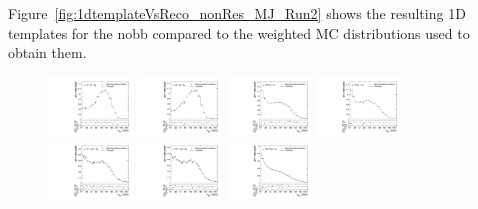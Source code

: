 Figure~\ref{fig:1dtemplateVsReco_nonRes_MJ_Run2} shows the resulting 1D templates for the nobb compared to the weighted MC distributions used to obtain them.

\begin{figure}[htbp]
  \centering
  \includegraphics[width=0.2\textwidth]{fig/analysisAppendix/templateVsReco_nonRes_r0_MJ_mu_HP_bb_LDy.pdf}
  \includegraphics[width=0.2\textwidth]{fig/analysisAppendix/templateVsReco_nonRes_r0_MJ_e_HP_bb_LDy.pdf}
  \includegraphics[width=0.2\textwidth]{fig/analysisAppendix/templateVsReco_nonRes_r0_MJ_mu_LP_bb_LDy.pdf}
  \includegraphics[width=0.2\textwidth]{fig/analysisAppendix/templateVsReco_nonRes_r0_MJ_e_LP_bb_LDy.pdf}\\
  \includegraphics[width=0.2\textwidth]{fig/analysisAppendix/templateVsReco_nonRes_r0_MJ_mu_HP_nobb_LDy.pdf}
  \includegraphics[width=0.2\textwidth]{fig/analysisAppendix/templateVsReco_nonRes_r0_MJ_e_HP_nobb_LDy.pdf}
  \includegraphics[width=0.2\textwidth]{fig/analysisAppendix/templateVsReco_nonRes_r0_MJ_mu_LP_nobb_LDy.pdf}

\end{figure}
